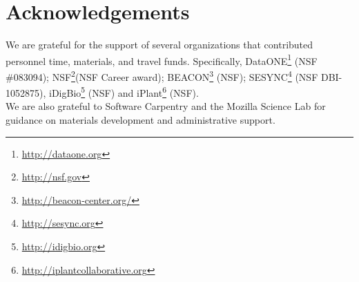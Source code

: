 \documentclass[15]{idcc}
\begin{document}
\section{Acknowledgements}

We are grateful for the support of several organizations that contributed personnel time, materials, and travel funds. Specifically, DataONE\footnote{\url{http://dataone.org}} (NSF \#083094); NSF\footnote{\url{http://nsf.gov}}(NSF Career award); BEACON\footnote{\url{http://beacon-center.org/}} (NSF); SESYNC\footnote{\url{http://sesync.org}} (NSF DBI-1052875), iDigBio\footnote{\url{http://idigbio.org}} (NSF) and iPlant\footnote{\url{http://iplantcollaborative.org}} (NSF).\\
We are also grateful to Software Carpentry and the Mozilla Science Lab for guidance on materials development and administrative support.
\end{document}
